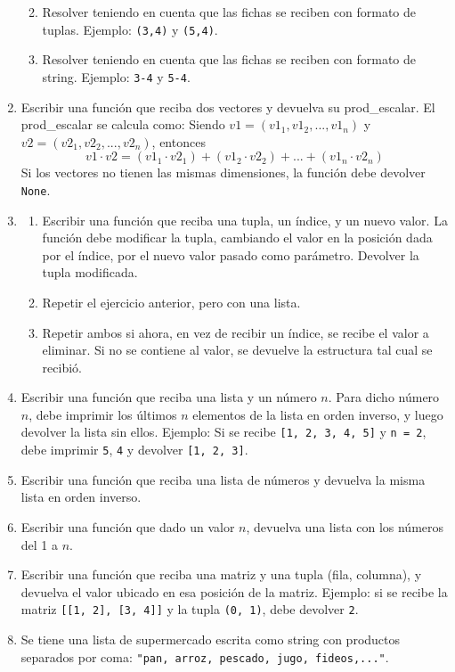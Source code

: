 \documentclass[
  letterpaper,
  DIV=11,
  numbers=noendperiod]{scrreprt}
\providecommand{\tightlist}{%
  \setlength{\itemsep}{0pt}\setlength{\parskip}{0pt}}\usepackage{longtable,booktabs,array}
\begin{document}
\begin{enumerate}
  \begin{enumerate}
  \def\labelenumii{\alph{enumii}.}
  \tightlist
  \item
    Resolver teniendo en cuenta que las fichas se reciben con formato de
    tuplas. Ejemplo: \texttt{(3,4)} y \texttt{(5,4)}.
  \item
    Resolver teniendo en cuenta que las fichas se reciben con formato de
    string. Ejemplo: \texttt{\textquotesingle{}3-4\textquotesingle{}} y
    \texttt{\textquotesingle{}5-4\textquotesingle{}}.
  \end{enumerate}
\item
  Escribir una función que reciba dos vectores y devuelva su
  prod\_escalar. El prod\_escalar se calcula como: Siendo
  \(v1 = (v1_1, v1_2, ..., v1_n)\) y \(v2 = (v2_1, v2_2, ..., v2_n)\),
  entonces\\
  \[v1 \cdot v2 = (v1_1 \cdot v2_1) + (v1_2 \cdot v2_2) + ... + (v1_n \cdot v2_n)\]
  Si los vectores no tienen las mismas dimensiones, la función debe
  devolver \texttt{None}.
\item
  \begin{enumerate}
  \def\labelenumii{\alph{enumii}.}
  \item
    Escribir una función que reciba una tupla, un índice, y un nuevo
    valor. La función debe modificar la tupla, cambiando el valor en la
    posición dada por el índice, por el nuevo valor pasado como
    parámetro. Devolver la tupla modificada.
  \item
    Repetir el ejercicio anterior, pero con una lista.
  \item
    Repetir ambos si ahora, en vez de recibir un índice, se recibe el
    valor a eliminar. Si no se contiene al valor, se devuelve la
    estructura tal cual se recibió.
  \end{enumerate}
\item
  Escribir una función que reciba una lista y un número \(n\). Para
  dicho número \(n\), debe imprimir los últimos \(n\) elementos de la
  lista en orden inverso, y luego devolver la lista sin ellos. Ejemplo:
  Si se recibe \texttt{{[}1,\ 2,\ 3,\ 4,\ 5{]}} y \texttt{n\ =\ 2}, debe
  imprimir \texttt{5}, \texttt{4} y devolver \texttt{{[}1,\ 2,\ 3{]}}.
\item
  Escribir una función que reciba una lista de números y devuelva la
  misma lista en orden inverso.
\item
  Escribir una función que dado un valor \(n\), devuelva una lista con
  los números del 1 a \(n\).
\item
  Escribir una función que reciba una matriz y una tupla (fila,
  columna), y devuelva el valor ubicado en esa posición de la matriz.
  Ejemplo: si se recibe la matriz
  \texttt{{[}{[}1,\ 2{]},\ {[}3,\ 4{]}{]}} y la tupla \texttt{(0,\ 1)},
  debe devolver \texttt{2}.
\item
  Se tiene una lista de supermercado escrita como string con productos
  separados por coma:
  \texttt{"pan,\ arroz,\ pescado,\ jugo,\ fideos,..."}.


\end{enumerate}
\end{document}
